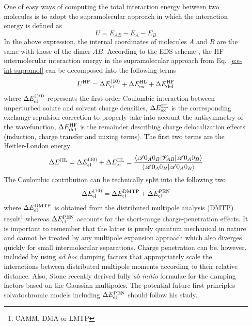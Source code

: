 \documentclass[a4paper,titlepage,twoside,fleqn,12pt]{book}
\begin{document}
\begin{refsection}
One of easy ways of computing the total interaction energy
between two molecules is to adopt the supramolecular approach
in which the interaction energy is defined as
%
\begin{equation} \label{e:e-int-supramol}
 U = E_{AB} - E_A - E_B
\end{equation}
%
In the above expression, the internal coordinates of molecules $A$ and $B$
are the same with those of the dimer $AB$.
According to the EDS scheme \citep{Sokalski.Roszak.Pecul.CPL.1988,
Chalasinski.Szczesniak.MolPhys.1988,Cybulski.Chalasinski.Moszynski.JCP.1990,
Gora.Bartkowiak.Roszak.Leszczynski.JCP.2004}, the HF
intermolecular interaction energy in the supramolecular
approach from Eq.~\eqref{e:e-int-supramol} can be decomposed
into the following terms
%
\begin{equation}
 U^{\rm HF} = \Delta E_{\rm el}^{(10)}    + 
              \Delta E_{\rm ex}^{\rm HL}  +
              \Delta E_{\rm del}^{\rm HF}
\end{equation}
%
where $\Delta E_{\rm el}^{(10)}$ represents the first\hyp{}order 
Coulombic interaction
between unperturbed solute and solvent charge densities, 
$\Delta E_{\rm ex}^{\rm HL}$ is the corresponding exchange\hyp{}repulsion
correction to properly take into account the antisymmetry of the wavefunction,
$\Delta E_{\rm del}^{\rm HF}$ is the remainder describing charge delocalization
effects (induction, charge transfer and mixing terms). The first two terms
are the Heitler\hyp{}London energy
%
\begin{equation}
 \Delta E^{\rm HL} = \Delta E_{\rm el}^{(10)}    + 
                     \Delta E_{\rm ex}^{\rm HL}
  = \frac{
\langle \mathscr{A} 0_A0_B \lvert \mathscr{V}_{AB} \rvert \mathscr{A} 0_A0_B \rangle 
}{
\langle \mathscr{A} 0_A0_B \vert \mathscr{A} 0_A0_B \rangle 
}
\end{equation}
%
The Coulombic contribution can be technically split into the following
two
%
\begin{equation}
 \Delta E_{\rm el}^{(10)} = \Delta E_{\rm el}^{\rm DMTP} + \Delta E_{\rm el}^{\rm PEN}
\end{equation}
%
where $\Delta E_{\rm el}^{\rm DMTP}$ is obtained from the distributed multipole 
analysis (DMTP) result\footnote{CAMM, DMA or LMTP} whereas
$\Delta E_{\rm el}^{\rm PEN}$ accounts for the short\hyp{}range charge\hyp{}penetration
effects. It is important to remember that the latter is purely quantum mechanical in
nature and cannot be treated by any multipole expansion approach which also diverges
quickly for small intermolecular separations.
Charge penetration can be, however, included by using \emph{ad hoc} damping factors
that appropriately scale the interactions between distributed multipole
moments according to their relative distance. \citep{Slipchenko.Gordon.JCC.2007,Wang.Truhlar.JCTC.2010}
Also, Stone recently derived fully \emph{ab initio} formulae
for the damping factors based on the Gaussian multipoles. \citep{Stone.JPCA.2011}
The potential future
first\hyp{}principles solvatochromic
models including $\Delta E_{\rm el}^{\rm PEN}$ should follow his study.


\end{refsection}
\end{document}
